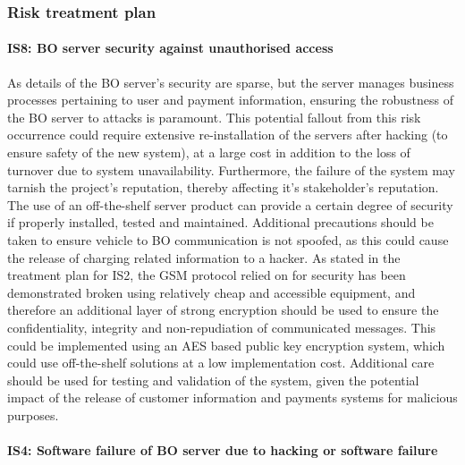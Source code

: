 \documentclass[british,11pt,a4paper]{article}
\begin{document}
\subsubsection{Risk treatment plan}

\paragraph{IS8: BO server security against unauthorised access \newline} 

As details of the BO server’s security are sparse, but the server manages business processes pertaining to user and payment information, ensuring the robustness of the BO server to attacks is paramount. This potential fallout from this risk occurrence could require extensive re-installation of the servers after hacking (to ensure safety of the new system), at a large cost in addition to the loss of turnover due to system unavailability. Furthermore, the failure of the system may tarnish the project's reputation, thereby affecting it's stakeholder's reputation. The use of an off-the-shelf server product can provide a certain degree of security if properly installed, tested and maintained. Additional precautions should be taken to ensure vehicle to BO communication is not spoofed, as this could cause the release of charging related information to a hacker. As stated in the treatment plan for IS2, the GSM protocol relied on for security has been demonstrated broken using relatively cheap and accessible equipment, and therefore an additional layer of strong encryption should be used to ensure the confidentiality, integrity and non-repudiation of communicated messages. This could be implemented using an AES based public key encryption system, which could use off-the-shelf solutions at a low implementation cost. Additional care should be used for testing and validation of the system, given the potential impact of the release of customer information and payments systems for malicious purposes. 

\paragraph{IS4: Software failure of BO server due to hacking or software failure \newline} 
\end{document}
